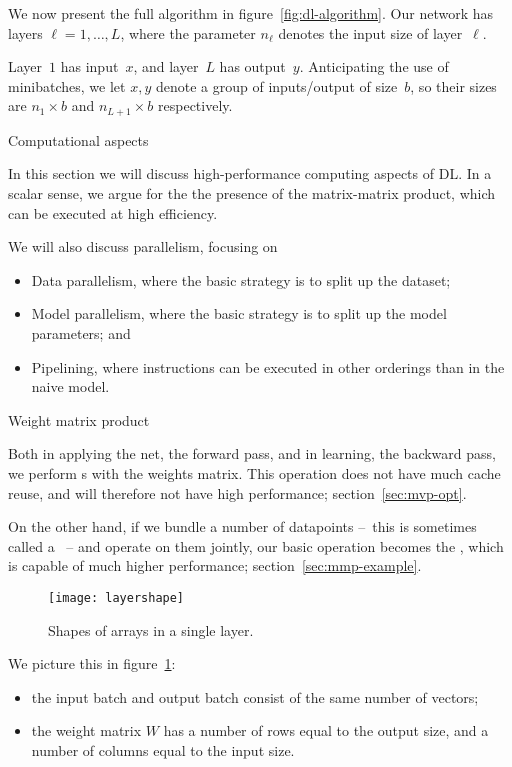 We now present the full algorithm in figure~\ref{fig:dl-algorithm}.
Our network has layers $\ell=1,\ldots,L$,
where the parameter $n_\ell$ denotes the input size of layer~$\ell$.

Layer~$1$ has input~$x$,
and layer~$L$ has output~$y$.
Anticipating the use of minibatches,
we let $x,y$ denote a group of inputs/output
of size~$b$,
so their sizes are $n_1\times b$ and $n_{L+1}\times b$
respectively.

 {Computational aspects}

In this section we will discuss high-performance computing aspects of \ac{DL}.
In a scalar sense, we argue for the the presence of the matrix-matrix product,
which can be executed at high efficiency.

We will also discuss parallelism, focusing on
\begin{itemize}
\item Data parallelism, where the basic strategy is to split up the dataset;
\item Model parallelism, where the basic strategy is to split up the model parameters; and
\item Pipelining, where instructions can be executed in other orderings than in the naive model.
\end{itemize}

 {Weight matrix product}

Both in applying the net, the forward pass,
and in learning, the backward pass,
we perform s
with the weights matrix.
This operation does not have much cache reuse,
and will therefore not have high performance; section~\ref{sec:mvp-opt}.

On the other hand, if we bundle a number of datapoints
--~this is sometimes called a ~--
and operate on them jointly, our basic operation becomes the
,
which is capable of much higher performance; section~\ref{sec:mmp-example}.

\begin{figure}[ht]
  \texttt{[image: layershape]}
  \caption{Shapes of arrays in a single layer.}
  \label{fig:layershape-seq}
\end{figure}

We picture this in figure~\ref{fig:layershape-seq}:
\begin{itemize}
\item the input batch and output batch consist of the same number of vectors;
\item the weight matrix $W$ has a number of rows equal to the output size,
  and a number of columns equal to the input size.
\end{itemize}

